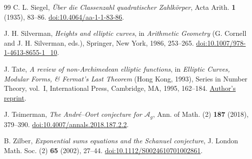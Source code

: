 \documentclass[11pt,a4paper]{article}
\numberwithin{equation}{section}
\theoremstyle{definition}
\theoremstyle{remark}
\newcommand{\A}{\mathcal A}
\begin{document}
\begin{thebibliography}{99}
C. L. Siegel,
\emph{\"Uber die Classenzahl quadratischer Zahlk\"orper},
Acta Arith. \textbf{1} (1935), 83--86.
\href{https://doi.org/10.4064/aa-1-1-83-86}{doi:10.4064/aa-1-1-83-86}.

J. H. Silverman,
\emph{Heights and elliptic curves}, in \emph{Arithmetic Geometry}
(G. Cornell and J. H. Silverman, eds.), Springer, New York, 1986,
253--265.
\href{https://doi.org/10.1007/978-1-4613-8655-1_10}
{doi:10.1007/978-1-4613-8655-1\_10}.

J. Tate,
\emph{A review of non-Archimedean elliptic functions}, in
\emph{Elliptic Curves, Modular Forms, \& Fermat's Last Theorem}
(Hong Kong, 1993), Series in Number Theory, vol.~I,
International Press, Cambridge, MA, 1995, 162--184.
\href{https://people.math.harvard.edu/~ctm/home/text/others/tate/tate-unif/tate-unif.pdf}
{Author's reprint}.

J. Tsimerman,
\emph{The Andr\'e--Oort conjecture for \(\A_g\)},
Ann. of Math. (2) \textbf{187} (2018), 379--390.
\href{https://doi.org/10.4007/annals.2018.187.2.2}
{doi:10.4007/annals.2018.187.2.2}.

B. Zilber,
\emph{Exponential sums equations and the Schanuel conjecture},
J. London Math. Soc. (2) \textbf{65} (2002), 27--44.
\href{https://doi.org/10.1112/S0024610701002861}
{doi:10.1112/S0024610701002861}.

\end{thebibliography}
\end{document}
